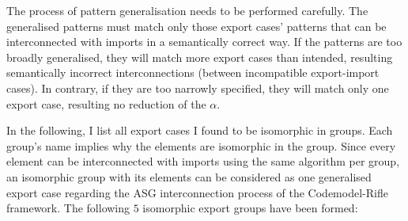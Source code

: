 The process of pattern generalisation needs to be performed carefully. The generalised patterns must match only those export cases' patterns that can be interconnected with imports in a semantically correct way. If the patterns are too broadly generalised, they will match more export cases than intended, resulting semantically incorrect interconnections (between incompatible export-import cases). In contrary, if they are too narrowly specified, they will match only one export case, resulting no reduction of the $\alpha$.

In the following, I list all export cases I found to be isomorphic in groups. Each group's name implies why the elements are isomorphic in the group. Since every element can be interconnected with imports using the same algorithm per group, an isomorphic group with its elements can be considered as one generalised export case regarding the ASG interconnection process of the Codemodel-Rifle framework. The following $5$ isomorphic export groups have been formed:

